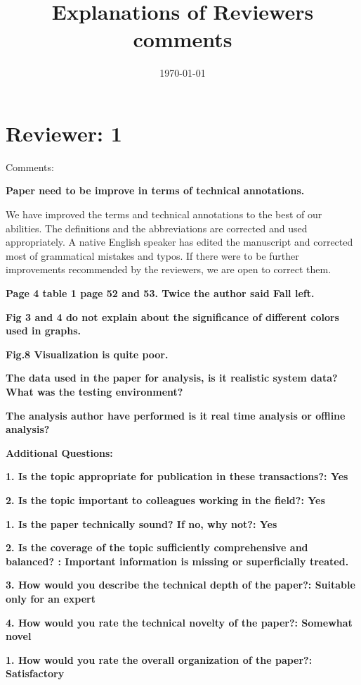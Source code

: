 \documentclass[12pt]{article}
\title{Explanations of Reviewers comments}
\date{\today}
\begin{document}
\maketitle

\section*{Reviewer: 1}


Comments:

\textbf{Paper need to be improve in terms of technical annotations.}

We have improved the terms and technical annotations to the best of our abilities. The 
definitions and the abbreviations are corrected and used appropriately.  A native 
English 
speaker has edited the manuscript and corrected most of grammatical mistakes and typos.  
If there 
were to be further improvements recommended by the reviewers, we are open to correct 
them. 

\textbf{Page 4 table 1 page 52 and 53. Twice the author said Fall left.}

\textbf{Fig 3 and 4 do not explain about the significance of different colors used in graphs.}

\textbf{Fig.8 Visualization is quite poor.}

\textbf{The data used in the paper for analysis, is it realistic system data? What was the testing environment?}

\textbf{The analysis author have performed is it real time analysis or offline analysis?}





\textbf{Additional Questions:}

\textbf{1. Is the topic appropriate for publication in these transactions?: Yes}

\textbf{2. Is the topic important to colleagues working in the field?: Yes}

\textbf{1. Is the paper technically sound? If no, why not?: Yes}


\textbf{2. Is the coverage of the topic sufficiently comprehensive and balanced? : Important information is missing or superficially treated.}

\textbf{3. How would you describe the technical depth of the paper?: Suitable only for an expert}

\textbf{4. How would you rate the technical novelty of the paper?: Somewhat novel}

\textbf{1. How would you rate the overall organization of the paper?: Satisfactory}
\end{document}
